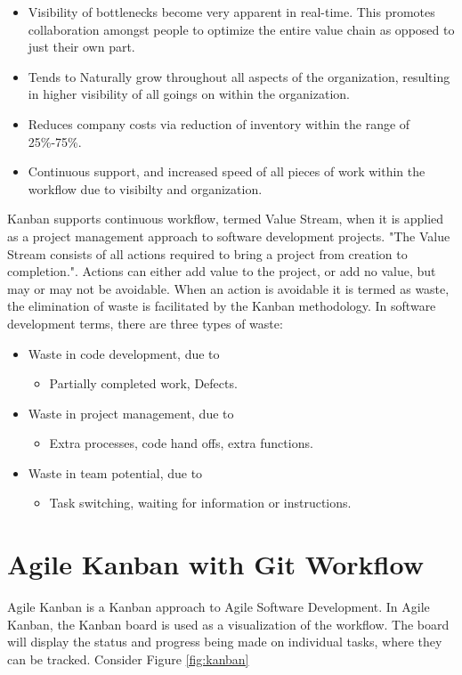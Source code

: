 \begin{itemize}
\item Visibility of bottlenecks become very apparent in real-time. This promotes collaboration amongst people to optimize the entire value chain as opposed to just their own part.
\item Tends to Naturally grow throughout all aspects of the organization, resulting in higher visibility of all goings on within the organization.
\item Reduces company costs via reduction of inventory within the range of 25\%-75\%.
\item Continuous support, and increased speed of all pieces of work within the workflow due to visibilty and organization.
\end{itemize}

Kanban supports continuous workflow, termed Value Stream, when it is applied as a project management approach to software development projects. "The Value Stream consists of all actions required to bring a project from creation to completion."\cite{kanban}. Actions can either add value to the project, or add no value, but may or may not be avoidable. When an action is avoidable it is termed as waste, the elimination of waste is facilitated by the Kanban methodology. In software development terms, there are three types of waste:
\begin{itemize}
\item Waste in code development, due to
	\begin{itemize}
	\item Partially completed work, Defects.
	\end{itemize}
\item Waste in project management, due to
	\begin{itemize}
	\item Extra processes, code hand offs, extra functions.
	\end{itemize}
\item Waste in team potential, due to
	\begin{itemize}
	\item Task switching, waiting for information or instructions.
	\end{itemize}
\end{itemize}

\section{Agile Kanban with Git Workflow}
Agile Kanban is a Kanban approach to Agile Software Development. In Agile Kanban, the Kanban board is used as a visualization of the workflow. The board will display the status and progress being made on individual tasks, where they can be tracked. Consider Figure \ref{fig:kanban}

